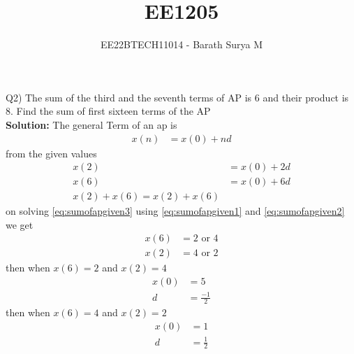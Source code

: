 \documentclass[journal,12pt,onecolumn]{IEEEtran}
\theoremstyle{remark}
\providecommand{\brak}[1]{\ensuremath{\left(#1\right)}}
\newcommand{\solution}{\noindent \textbf{Solution: }}
\begin{document}

\vspace{3cm}

\title{EE1205}
\author{EE22BTECH11014 - Barath Surya M}
\maketitle
Q2) The sum of the third and the seventh terms of AP is 6 and their product is 8. Find the sum of first sixteen terms of the AP\\
\solution
The general Term of an ap is
\begin{align}
    x\brak{n} & = x\brak{0} + nd
\end{align}
from the given values
\begin{align}
    x\brak{2} & = x\brak{0} + 2d \label{eq:sumofapgiven1} \\
    x\brak{6} & = x\brak{0} +6d \label{eq:sumofapgiven2}  \\
    x\brak{2} + x\brak{6} = x\brak{2} + x\brak{6} \label{eq:sumofapgiven3}
\end{align}
on solving \eqref{eq:sumofapgiven3} using \eqref{eq:sumofapgiven1} and \eqref{eq:sumofapgiven2}
we get
\begin{align}
    x\brak{6} & =2 \text{ or } 4  \\
    x\brak{2} & = 4 \text{ or } 2
\end{align}
then when $x\brak{6}=2$ and $x\brak{2}=4$
\begin{align}
    x\brak{0} & =5             \\
    d         & = \frac{-1}{2}
\end{align}
then when $x\brak{6}=4$ and $x\brak{2}=2$
\begin{align}
    x\brak{0} & =1            \\
    d         & = \frac{1}{2}
\end{align}
\end{document}
